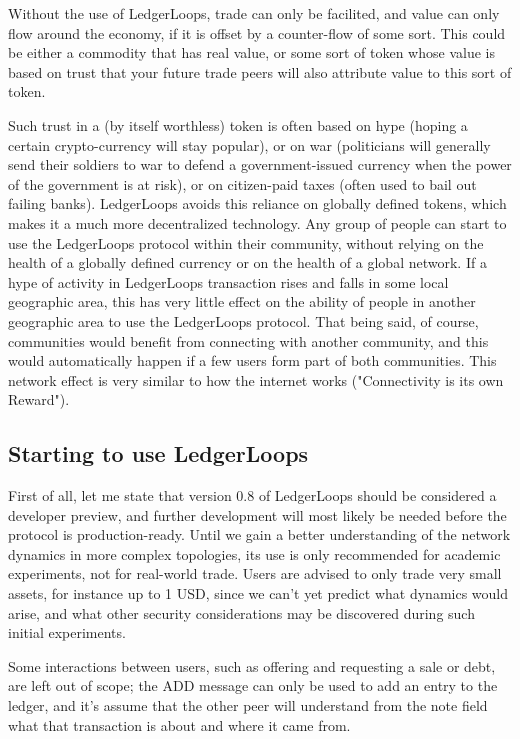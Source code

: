\documentclass[11pt,twoside,a4paper]{article}
\begin{document}
Without the use of LedgerLoops, trade can only be facilited, and value can only flow around the economy, if it is offset by a counter-flow of some sort. This could be either a commodity that has real value, or some sort of token whose value is based on trust that your future trade peers will also attribute value to this sort of token.

Such trust in a (by itself worthless) token is often based on hype (hoping a certain crypto-currency will stay popular), or on war (politicians will generally send their soldiers to war to defend a government-issued currency when the power of the government is at risk), or on citizen-paid taxes (often used to bail out failing banks). LedgerLoops avoids this reliance on globally defined tokens, which makes it a much more decentralized technology. Any group of people can start to use the LedgerLoops protocol within their community, without relying on the health of a globally defined currency or on the health of a global network. If a hype of activity in LedgerLoops transaction rises and falls in some local geographic area, this has very little effect on the ability of people in another geographic area to use the LedgerLoops protocol. That being said, of course, communities would benefit from connecting with another community, and this would automatically happen if a few users form part of both communities. This network effect is very similar to how the internet works ("Connectivity is its own Reward").

\subsection{Starting to use LedgerLoops}
First of all, let me state that version 0.8 of LedgerLoops should be considered a developer preview, and further development will most likely be needed before the protocol is production-ready. Until we gain a better understanding of the network dynamics in more complex topologies, its use is only recommended for academic experiments, not for real-world trade. Users are advised to only trade very small assets, for instance up to 1 USD, since we can't yet predict what dynamics would arise, and what other security considerations may be discovered during such initial experiments.

Some interactions between users, such as offering and requesting a sale or debt, are left out of scope; the ADD message can only be used to add an entry to the ledger, and it's assume that the other peer will understand from the note field what that transaction is about and where it came from.
\end{document}
